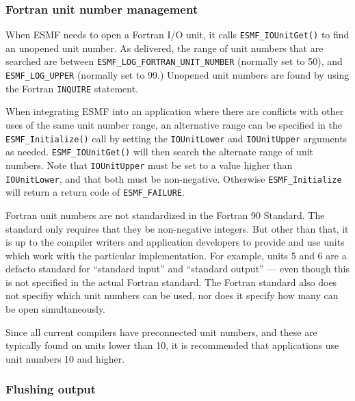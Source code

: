 

\subsubsection{Fortran unit number management} \label{fio:unitnumbers}

When ESMF needs to open a Fortran I/O unit, it calls {\tt ESMF\_IOUnitGet()} to find
an unopened unit number.  As delivered, the range of unit numbers that are
searched are between {\tt ESMF\_LOG\_FORTRAN\_UNIT\_NUMBER} (normally set to
50), and {\tt ESMF\_LOG\_UPPER} (normally set to 99.)
Unopened unit numbers are found by using the Fortran {\tt INQUIRE} statement.

When integrating ESMF into an application where there are conflicts with
other uses of the same unit number range, an alternative range can be specified
in the {\tt ESMF\_Initialize()} call by setting the {\tt IOUnitLower} and {\tt IOUnitUpper}
arguments as needed.  {\tt ESMF\_IOUnitGet()} will then search the alternate range
of unit numbers.  Note that {\tt IOUnitUpper} must be set to a value higher than
{\tt IOUnitLower}, and that both must be non-negative.  Otherwise {\tt ESMF\_Initialize}
will return a return code of {\tt ESMF\_FAILURE}.

Fortran unit numbers are not standardized in the Fortran 90 Standard.  The standard
only requires that they be non-negative integers.  But other than that, it is
up to the compiler writers and application developers to provide and
use units which work with the particular implementation.  For example,
units 5 and 6 are a defacto standard for ``standard input'' and
``standard output'' --- even though this is not specified in the actual Fortran
standard.  The Fortran standard also does not specifiy which unit numbers can
be used, nor does it specify how many can be open simultaneously.

Since all current compilers have preconnected unit numbers, and these are
typically found on units lower than 10, it is recommended that applications
use unit numbers 10 and higher.

\subsubsection{Flushing output}

